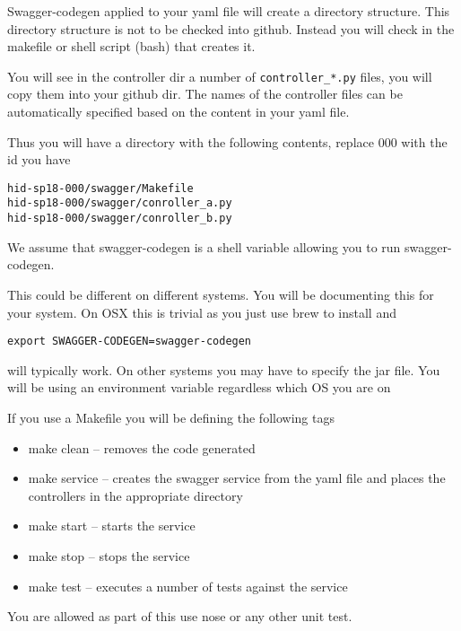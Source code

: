 \begin{exercise}
Swagger-codegen applied to your yaml file will create a directory
structure. This directory structure is not to be checked into
github. Instead you will check in the makefile or shell script (bash)
that creates it.

You will see in the controller dir a number of \verb|controller_*.py|
files, you will copy them into your github dir. The names of the
controller files can be automatically specified based on the content
in your yaml file.

 

Thus you will have a directory with the following contents, replace
000 with the id you have

 
\begin{lstlisting}
hid-sp18-000/swagger/Makefile
hid-sp18-000/swagger/conroller_a.py
hid-sp18-000/swagger/conroller_b.py
\end{lstlisting}
 

We assume that swagger-codegen is a shell variable allowing you to run
swagger-codegen.

This could be different on different systems. You will be documenting
this for your system. On OSX this is trivial as you just use brew to
install and

\begin{lstlisting}
export SWAGGER-CODEGEN=swagger-codegen
\end{lstlisting}
 
will typically work. On other systems you may have to specify the jar
file. You will be using an environment variable regardless which OS
you are on

If you use a Makefile you will be defining the following tags

 
\begin{itemize}
\item make clean -- removes the code generated

\item make service -- creates the swagger service from the yaml file
  and places the controllers in the appropriate directory

\item make start  -- starts the service

\item make stop -- stops the service

\item make test -- executes a number of tests against the service
\end{itemize}

You are allowed as part of this use nose or any other unit test. 

\end{exercise}


